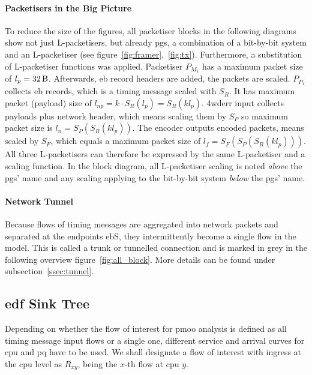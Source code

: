 \paragraph{Packetisers in the Big Picture}
To reduce the size of the figures, all packetiser blocks in the following diagrams show not just L-packetisers, but already \gls{pgs},
a combination of a bit-by-bit system and an L-packetiser (see figure~\ref{fig:framer},~\ref{fig:tx}). Furthermore, a substitution of L-packetiser functions was applied.
Packetiser $P_{M_1}$ has a maximum packet size of $l_p = \SI{32}{\byte}$. Afterwards, \gls{eb} record headers are added, the packets are scaled. $P_{P_1}$ collects \gls{eb} records, which is a timing message scaled with $S_R$.
It has maximum packet (payload) size of $l_{np} = k \cdot S_R(l_p) = S_R(kl_p)$. \gls{4wderr} input collects payloads plus network header, which means scaling them by $S_P$ so maximum packet size is
$l_{n} = S_P(S_R(kl_p))$. The encoder outputs encoded packets,  means scaled by $S_F$, which equals a maximum packet size of $l_{f} = S_F(S_P(S_R(kl_p)))$.
All three L-packetisers can therefore be expressed by the same L-packetiser and a scaling function.
In the block diagram, all L-packetiser scaling is noted \emph{above} the \gls{pgs}' name
and any scaling applying to the bit-by-bit system \emph{below} the \gls{pgs}' name.
\paragraph{Network Tunnel}
Because flows of timing messages are aggregated into network packets and separated at the endpoints \gls{eb}S, they intermittently become a single flow in the model. This is called a trunk or tunnelled connection
and is marked in grey in the following overview figure~\ref{fig:all_block}. More details can be found under subsection~\ref{ssec:tunnel}.
\subsection{\gls{edf} Sink Tree}
Depending on whether the flow of interest for \gls{pmoo} analysis is defined as all timing message input flows or a single one,
different service and arrival curves for \gls{cpu} and \gls{pq} have to be used. We shall designate a flow of interest with ingress at the \gls{cpu}
level as $R_{xy}$, being the $x$-th flow at \gls{cpu} $y$.

